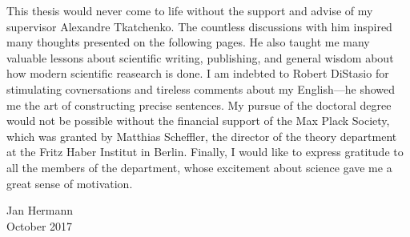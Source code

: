This thesis would never come to life without the support and advise of my supervisor Alexandre Tkatchenko.
The countless discussions with him inspired many thoughts presented on the following pages.
He also taught me many valuable lessons about scientific writing, publishing, and general wisdom about how modern scientific reasearch is done.
I am indebted to Robert DiStasio for stimulating covnersations and tireless comments about my English---he showed me the art of constructing precise sentences.
My pursue of the doctoral degree would not be possible without the financial support of the Max Plack Society, which was granted by Matthias Scheffler, the director of the theory department at the Fritz Haber Institut in Berlin.
Finally, I would like to express gratitude to all the members of the department, whose excitement about science gave me a great sense of motivation.

\begin{flushright}
Jan Hermann \\
October 2017
\end{flushright}
